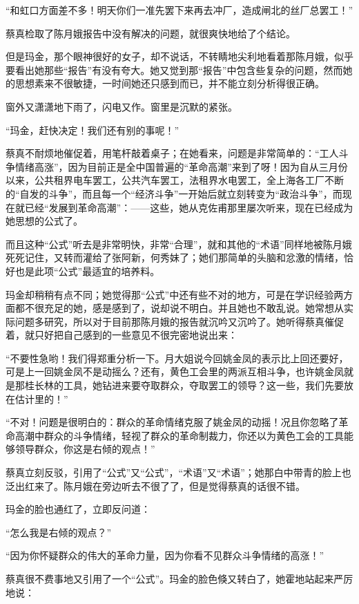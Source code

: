 \par “和虹口方面差不多！明天你们一准先罢下来再去冲厂，造成闸北的丝厂总罢工！”
\par 蔡真检取了陈月娥报告中没有解决的问题，就很爽快地给了个结论。
\par 但是玛金，那个眼神很好的女子，却不说话，不转睛地尖利地看着那陈月娥，似乎要看出她那些“报告”有没有夸大。她又觉到那“报告”中包含些复杂的问题，然而她的思想素来不很敏捷，一时间她还只感到而已，并不能立刻分析得很正确。
\par 窗外又潇潇地下雨了，闪电又作。窗里是沉默的紧张。
\par “玛金，赶快决定！我们还有别的事呢！”
\par 蔡真不耐烦地催促着，用笔杆敲着桌子；在她看来，问题是非常简单的：“工人斗争情绪高涨”，因为目前正是全中国普遍的“革命高潮”来到了呀！因为自从三月份以来，公共租界电车罢工，公共汽车罢工，法租界水电罢工，全上海各工厂不断的“自发的斗争”，而且每一个“经济斗争”一开始后就立刻转变为“政治斗争”，而现在就已经“发展到革命高潮”：——这些，她从克佐甫那里屡次听来，现在已经成为她思想的公式了。
\par 而且这种“公式”听去是非常明快，非常“合理”，就和其他的“术语”同样地被陈月娥死死记住，又转而灌给了张阿新，何秀妹了；她们那简单的头脑和忿激的情绪，恰好也是此项“公式”最适宜的培养料。
\par 玛金却稍稍有点不同；她觉得那“公式”中还有些不对的地方，可是在学识经验两方面都不很充足的她，感是感到了，说却说不明白。并且她也不敢乱说。她常想从实际问题多研究，所以对于目前那陈月娥的报告就沉吟又沉吟了。她听得蔡真催促着，就只好把自己感到的一些意见不很完密地说出来：
\par “不要性急哟！我们得郑重分析一下。月大姐说今回姚金凤的表示比上回还要好，可是上一回姚金凤不是动摇么？还有，黄色工会里的两派互相斗争，也许姚金凤就是那桂长林的工具，她钻进来要夺取群众，夺取罢工的领导？这一些，我们先要放在估计里的！”
\par “不对！问题是很明白的：群众的革命情绪克服了姚金凤的动摇！况且你忽略了革命高潮中群众的斗争情绪，轻视了群众的革命制裁力，你还以为黄色工会的工具能够领导群众，你这是右倾的观点！”
\par 蔡真立刻反驳，引用了“公式”又“公式”，“术语”又“术语”；她那白中带青的脸上也泛出红来了。陈月娥在旁边听去不很了了，但是觉得蔡真的话很不错。
\par 玛金的脸也通红了，立即反问道：
\par “怎么我是右倾的观点？”
\par “因为你怀疑群众的伟大的革命力量，因为你看不见群众斗争情绪的高涨！”
\par 蔡真很不费事地又引用了一个“公式”。玛金的脸色倏又转白了，她霍地站起来严厉地说：
